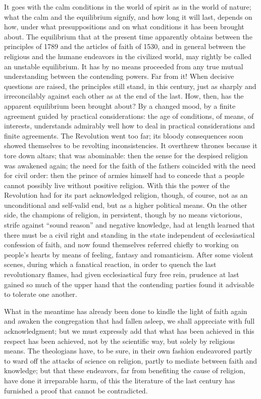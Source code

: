 \documentclass[12pt]{book}
\newcommand{\opage}[1]{\marginnote{\footnotesize\textit{[#1]}}}
\begin{document}
It goes with the calm conditions in the world of spirit as in the world
of nature; what the calm and the equilibrium signify, and how long it
will last, depends on how, under what presuppositions and on what
conditions it has been brought about. The equilibrium that at the
present time apparently obtains between the principles of 1789 and the
articles of faith of 1530, and in general between the religious and the
humane endeavors in the civilized world, may rightly be called an
unstable equilibrium. It has by no means proceeded from any true mutual
understanding between the contending powers. Far from it! When decisive
questions are raised, the principles still stand, in this century, just
as sharply and irreconcilably against each other as at the end of the
last. How, then, has the apparent equilibrium been brought about? By a
changed mood, by a finite agreement guided by practical considerations:
the age of conditions, of means, of interests, understands admirably
well how to deal in practical considerations and finite agreements. The
Revolution went too far; its bloody consequences soon showed themselves
to be revolting inconsistencies. It overthrew thrones because it tore
down altars; that was abominable: then the sense for the despised
religion was awakened again; the need for the faith of the fathers
coincided with the need for civil order: then the prince of armies
himself had to concede that a people cannot possibly live without
positive religion. With this the power of the Revolution had for its
part acknowledged religion, though, of course, not as an unconditional
and self-valid end, but as a higher political means. On the other side,
the champions of religion, in persistent, though by no means victorious,
\opage{39}\setcounter{footnote}{0}%
strife against ``sound reason'' and negative knowledge, had at length
learned that there must be a civil right and standing in the state
independent of ecclesiastical confession of faith, and now found
themselves referred chiefly to working on people's hearts by means of
feeling, fantasy and romanticism. After some violent scenes, during
which a fanatical reaction, in order to quench the last revolutionary
flames, had given ecclesiastical fury free rein, prudence at last gained
so much of the upper hand that the contending parties found it advisable
to tolerate one another.

What in the meantime has already been done to kindle the light of faith
again and awaken the congregation that had fallen asleep, we shall
appreciate with full acknowledgment; but we must expressly add that what
has been achieved in this respect has been achieved, not by the
scientific way, but solely by religious means. The theologians have, to
be sure, in their own fashion endeavored partly to ward off the attacks
of science on religion, partly to mediate between faith and knowledge;
but that these endeavors, far from benefiting the cause of religion,
have done it irreparable harm, of this the literature of the last
century has furnished a proof that cannot be contradicted.
\end{document}
